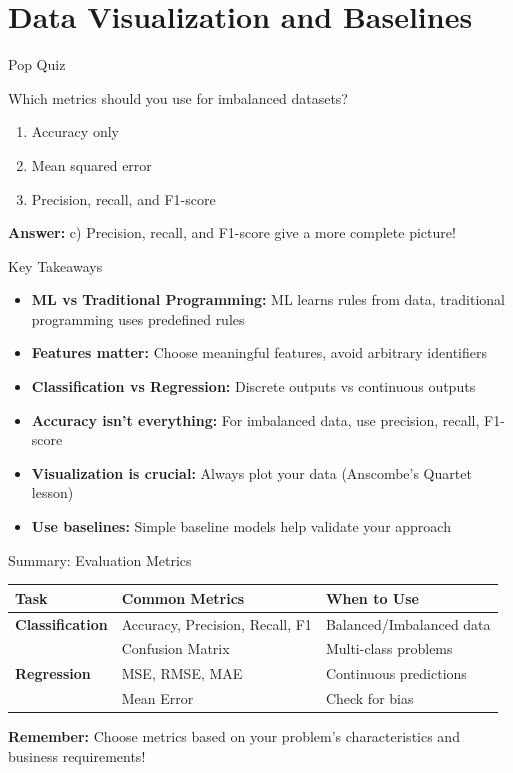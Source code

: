\documentclass[usenames,dvipsnames]{beamer}
\begin{document}
\section{Data Visualization and Baselines}

\begin{frame}{Pop Quiz}
\begin{popquizbox}{1}
Which metrics should you use for imbalanced datasets?
\begin{enumerate}
\item Accuracy only  
\item Mean squared error
\item Precision, recall, and F1-score
\end{enumerate}

\vspace{0.5em}
\textbf{Answer:} c) Precision, recall, and F1-score give a more complete picture!
\end{popquizbox}
\end{frame}

\begin{frame}{Key Takeaways}
\begin{itemize}
\item \textbf{ML vs Traditional Programming:} ML learns rules from data, traditional programming uses predefined rules
	\pause
\item \textbf{Features matter:} Choose meaningful features, avoid arbitrary identifiers
	\pause
\item \textbf{Classification vs Regression:} Discrete outputs vs continuous outputs
	\pause
\item \textbf{Accuracy isn't everything:} For imbalanced data, use precision, recall, F1-score
	\pause
\item \textbf{Visualization is crucial:} Always plot your data (Anscombe's Quartet lesson)
	\pause
\item \textbf{Use baselines:} Simple baseline models help validate your approach
\end{itemize}
\end{frame}

\begin{frame}{Summary: Evaluation Metrics}
\begin{center}
\begin{tabular}{|l|l|l|}
\hline
\textbf{Task} & \textbf{Common Metrics} & \textbf{When to Use} \\
\hline
\textbf{Classification} & Accuracy, Precision, Recall, F1 & Balanced/Imbalanced data \\
 & Confusion Matrix & Multi-class problems \\
\hline
\textbf{Regression} & MSE, RMSE, MAE & Continuous predictions \\
 & Mean Error & Check for bias \\
\hline
\end{tabular}
\end{center}

\vspace{1cm}
\textbf{Remember:} Choose metrics based on your problem's characteristics and business requirements!
\end{frame}
\end{document}
